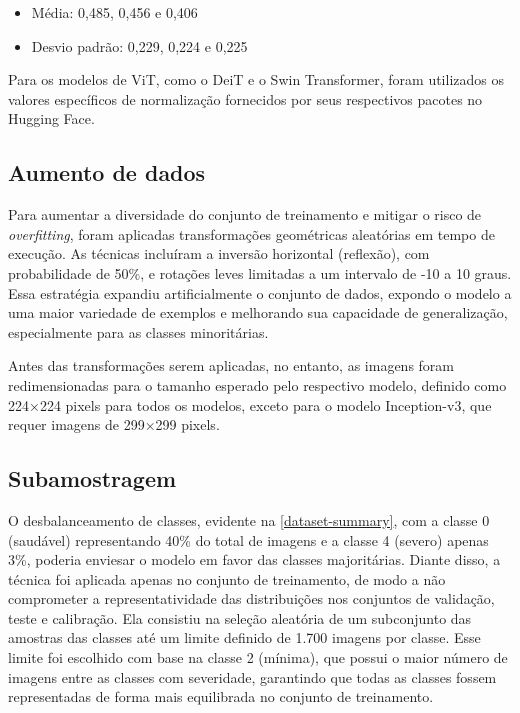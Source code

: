 \begin{itemize}
    \item Média: 0,485, 0,456 e 0,406
    \item Desvio padrão: 0,229, 0,224 e 0,225
\end{itemize}

Para os modelos de ViT, como o DeiT e o Swin Transformer, foram utilizados os valores específicos de normalização fornecidos por seus respectivos pacotes no Hugging Face.

\subsection{Aumento de dados}

Para aumentar a diversidade do conjunto de treinamento e mitigar o risco de \textit{overfitting}, foram aplicadas transformações geométricas aleatórias em tempo de execução. As técnicas incluíram a inversão horizontal (reflexão), com probabilidade de 50\%, e rotações leves limitadas a um intervalo de -10 a 10 graus. Essa estratégia expandiu artificialmente o conjunto de dados, expondo o modelo a uma maior variedade de exemplos e melhorando sua capacidade de generalização, especialmente para as classes minoritárias.

Antes das transformações serem aplicadas, no entanto, as imagens foram redimensionadas para o tamanho esperado pelo respectivo modelo, definido como 224×224 pixels para todos os modelos, exceto para o modelo Inception-v3, que requer imagens de 299×299 pixels.

\subsection{Subamostragem}

O desbalanceamento de classes, evidente na \autoref{dataset-summary}, com a classe 0 (saudável) representando 40\% do total de imagens e a classe 4 (severo) apenas 3\%, poderia enviesar o modelo em favor das classes majoritárias. Diante disso, a técnica foi aplicada apenas no conjunto de treinamento, de modo a não comprometer a representatividade das distribuições nos conjuntos de validação, teste e calibração. Ela consistiu na seleção aleatória de um subconjunto das amostras das classes até um limite definido de 1.700 imagens por classe. Esse limite foi escolhido com base na classe 2 (mínima), que possui o maior número de imagens entre as classes com severidade, garantindo que todas as classes fossem representadas de forma mais equilibrada no conjunto de treinamento.

